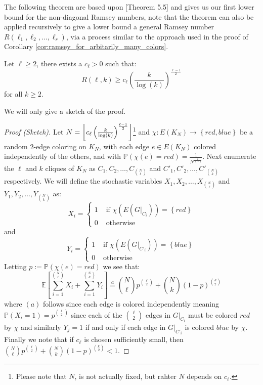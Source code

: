 The following theorem are based upon \cite{fg_and_rt}[Theorem 5.5] and gives us our first lower bound for the non-diagonal Ramsey numbers, note that the theorem can also be applied recursively to give a lower bound a general Ramsey number $R(\ell_1, \ell_2, \ldots, \ell_{r})$, via a process similar to the approach used in the proof of Corollary \ref{cor:ramsey_for_arbitarily_many_colors}.
\begin{theorem}
	Let $\ell \geq 2$, there exists a $c_{\ell} > 0$ such that:
	\begin{equation*}
		R(\ell, k) \geq c_{\ell} \left(\frac{k}{\log(k)}\right)^{\frac{\ell - 1}{2}}
	\end{equation*}
	for all $k \geq 2$.
\end{theorem}
We will only give a sketch of the proof.
\begin{proof}[Proof (Sketch)]
	Let $N = \left\lfloor c_{\ell} \left(\frac{k}{\log(k)}\right)^{\frac{\ell - 1}{2}}\right\rfloor$\footnote{Please note that $N$, is not actually fixed, but rahter $N$ depends on $c_{\ell}$.} and $\chi: E(K_N) \to \left\{red, blue\right\}$ be a random $2$-edge coloring on $K_N$, with each edge $e \in E(K_{N})$ colored independently of the others, and with $\mathbb{P}(\chi(e) = red) = \frac{1}{N^{\frac{2}{\ell  - 1}}}$. Next enumerate the $\ell$ and $k$ cliques of $K_N$ as $C_1, C_2, \ldots, C_{\binom{N}{\ell}}$ and $C'_1, C'_2, \ldots, C'_{\binom{N}{k}}$ respectively. We will define the stochastic variables $X_1, X_2, \ldots, X_{\binom{N}{\ell}}$ and $Y_1, Y_2, \ldots, Y_{\binom{N}{k}}$ as:
	\begin{equation*}
		X_i = \begin{cases}
			1 & \text{ if } \chi(E(G \vert_{C_i})) = \left\{red\right\} \\
			0 & \text{ otherwise }
		\end{cases}
	\end{equation*}
	and
	\begin{equation*}
		Y_i = \begin{cases}
			1 & \text{ if } \chi(E(G \vert_{C'_i})) = \left\{blue\right\} \\
			0 & \text{ otherwise }
		\end{cases}
	\end{equation*}
	Letting $p := \mathbb{P}(\chi(e) = red)$ we see that:
	\begin{equation*}
		\mathbb{E} \left[\sum_{i = 1}^{\binom{N}{\ell}} X_i + \sum_{i = 1}^{\binom{N}{k}} Y_{i}\right] \stackrel{a}{=} \binom{N}{\ell} p^{\binom{\ell}{2}} + \binom{N}{k}(1 - p)^{\binom{k}{2}}
	\end{equation*}
	where $(a)$ follows since each edge is colored independently meaning $\mathbb{P} \left(X_i = 1\right) = p^{\binom{\ell}{2}}$ since each of the $\binom{\ell}{2}$ edges in $G \vert_{C_i}$ must be colored $red$ by $\chi$ and similarly $Y_j = 1$ if and only if each edge in $G \vert_{C'_{i}}$ is colored $blue$ by $\chi$. Finally we note that if $c_{\ell}$ is chosen sufficiently small, then $\binom{N}{\ell} p^{\binom{\ell}{2}} + \binom{N}{k}(1 - p)^{\binom{k}{2}} < 1$.
\end{proof}
